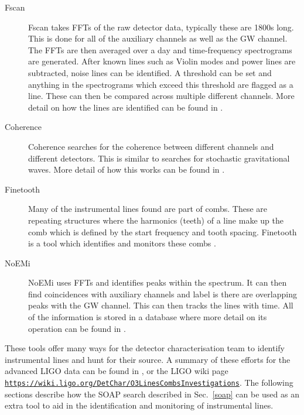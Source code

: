 \begin{description}
	\item[Fscan] Fscan \citep{coughlin2010NoiseLine} takes \glspl{FFT} of the raw detector data, typically these are 1800s long. This is done for all of the auxiliary channels as well as the \gls{GW} channel. The \glspl{FFT} are then averaged over a day and time-frequency spectrograms are generated. After known lines such as Violin modes and power lines are subtracted, noise lines can be identified. A threshold can be set and anything in the spectrograms which exceed this threshold are flagged as a line. These can then be compared across multiple different channels. More detail on how the lines are identified can be found in \citep{coughlin2010NoiseLine}.
	
	\item[Coherence] Coherence searches for the coherence between different channels and different detectors. This is similar to searches for stochastic gravitational waves. More detail of how this works can be found in \citep{covas2018IdentificationMitigation}.
	
	\item[Finetooth] Many of the instrumental lines found are part of combs. These are repeating structures where the harmonics (teeth) of a line make up the comb which is defined by the start frequency and tooth spacing. Finetooth is a tool which identifies and monitors these combs \citep{neunzertDailyComb}.
	
	\item[NoEMi] NoEMi uses \glspl{FFT} and identifies peaks within the spectrum. It can then find coincidences with auxiliary channels and label is there are overlapping peaks with the \gls{GW} channel. This can then tracks the lines with time. All of the information is stored in a database where more detail on its operation can be found in \citep{accadia2012NoEMiNoise}.
	
\end{description}


These tools offer many ways for the detector characterisation team to identify instrumental lines and hunt for their source. A summary of these efforts for the advanced \gls{LIGO} data can be found in \citep{covas2018IdentificationMitigation}, or the \gls{LIGO} wiki page {\tt \url{https://wiki.ligo.org/DetChar/O3LinesCombsInvestigations}}.
The following sections describe how the SOAP search described in Sec.~\ref{soap} can be used as an extra tool to aid in the identification and monitoring of instrumental lines.

